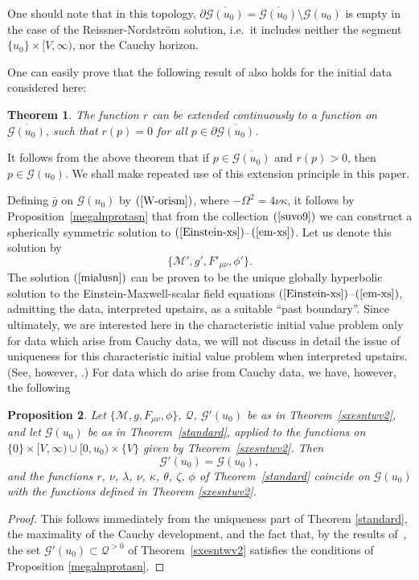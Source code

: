\documentclass{article}
\newtheorem{theorem}{Theorem}[section]
\newtheorem{proposition}[theorem]{Proposition}
\begin{document}
One should note that in this topology,
$\partial\overline{\mathcal{G}(u_0)}=\overline{\mathcal{G}(u_0)}\setminus\mathcal{G}(u_0)$
is empty in the case of the Reissner-Nordstr\"om solution, i.e.~it
includes neither the segment $\{u_0\}\times[V,\infty)$, 
nor the Cauchy horizon.

One can easily prove that the following result of \cite{md:si}
also holds for the initial data considered here:

\begin{theorem}
\label{epekt9e}
The function $r$ can be extended continuously
to a function on $\overline{\mathcal{G}(u_0)}$, such that $r(p)=0$
for all $p\in\partial\overline{\mathcal{G}(u_0)}$.
\end{theorem}

It follows from the above theorem that if 
$p\in\overline{\mathcal{G}(u_0)}$ and $r(p)>0$,
then $p\in\mathcal{G}(u_0)$. 
We shall make repeated use of this extension principle in this paper.


Defining $\bar{g}$ on $\mathcal{G}(u_0)$ by
$(\ref{W-orism})$, where $-\Omega^2=4\nu\kappa$,
it follows by Proposition~\ref{megalnprotasn} that 
from the collection $(\ref{suvo9})$ we can construct 
a spherically symmetric solution to $(\ref{Einstein-xs})$--$(\ref{em-xs})$. 
Let
us denote this solution by 
\begin{equation}
\label{mialusn}
\{\mathcal{M}', g', F'_{\mu\nu}, \phi'\}.
\end{equation}
The solution $(\ref{mialusn})$
can be proven to be the unique 
globally hyperbolic solution to the Einstein-Maxwell-scalar field
equations $(\ref{Einstein-xs})$--$(\ref{em-xs})$,
admitting the data, interpreted upstairs, as a suitable ``past boundary''.
Since ultimately, we are interested here in the characteristic initial value
problem only for data which arise from Cauchy data, we will not discuss
in detail the issue of uniqueness for this characteristic initial value problem when
interpreted upstairs. (See, however, \cite{rigid}.) 
For data which do arise from Cauchy data, we have, however, the following
\begin{proposition} 
Let $\{\mathcal{M}, g, F_{\mu\nu}, \phi\}$, $\mathcal{Q}$, $\mathcal{G}'(u_0)$
 be as in Theorem~\ref{sxesntwv2}, and let $\mathcal{G}(u_0)$ be
as in Theorem~\ref{standard}, applied to the functions 
on $\{0\}\times[V,\infty)\cup[0,u_0)\times\{V\}$ given by
Theorem~\ref{sxesntwv2}. Then
\[
\mathcal{G}'(u_0)=\mathcal{G}(u_0), 
\]
and the functions $r$, $\nu$, $\lambda$, $\nu$, $\kappa$,
$\theta$, $\zeta$, $\phi$ of Theorem~\ref{standard} coincide on 
$\mathcal{G}(u_0)$ with the functions defined in
Theorem \ref{sxesntwv2}.
\end{proposition}
\begin{proof}
This follows immediately from 
the uniqueness part of Theorem \ref{standard}, the maximality
of the Cauchy development, and 
the fact that, by the results of~\cite{md:sssts},
the set $\mathcal{G}'(u_0)\subset\mathcal{Q}^{>0}$ of Theorem~\ref{sxesntwv2}
satisfies the conditions of Proposition \ref{megalnprotasn}.
\end{proof}
\end{document}
